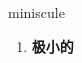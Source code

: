 
\begin{frame}
{\huge miniscule}
\begin{center}
\begin{enumerate}\Large
  \item \textbf{极小的}
\end{enumerate}
\end{center}
\end{frame}
